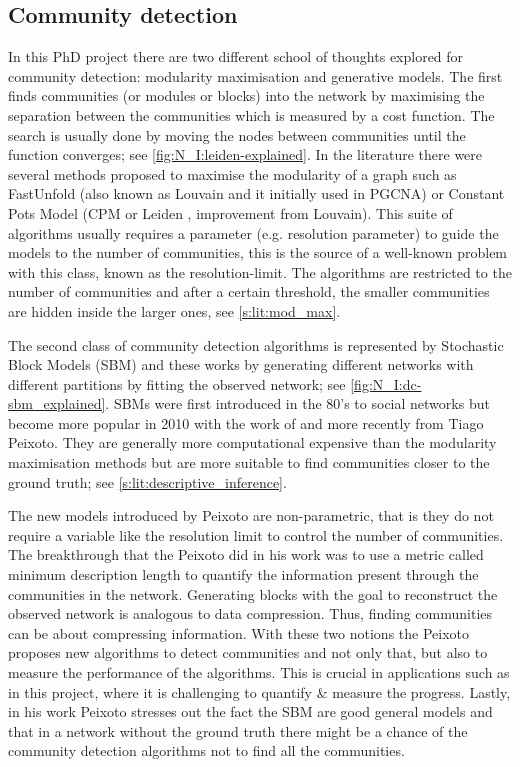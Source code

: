 \subsection{Community detection}

In this PhD project there are two different school of thoughts explored for community detection: modularity maximisation and generative models. The first finds communities (or modules or blocks) into the network by maximising the separation between the communities which is measured by a cost function. The search is usually done by moving the nodes between communities until the function converges; see \cref{fig:N_I:leiden-explained}. In the literature there were several methods proposed to maximise the modularity of a graph such as FastUnfold \citet{Blondel2008-ik} (also known as Louvain and it initially used in PGCNA) or Constant Pots Model (CPM or Leiden \citet{Traag2019-ne}, improvement from Louvain). This suite of algorithms usually requires a parameter (e.g. resolution parameter) to guide the models to the number of communities, this is the source of a well-known problem with this class, known as the resolution-limit. The algorithms are restricted to the number of communities and after a certain threshold, the smaller communities are hidden inside the larger ones, see \cref{s:lit:mod_max}.

The second class of community detection algorithms is represented by Stochastic Block Models (SBM) and these works by generating different networks with different partitions by fitting the observed network; see \cref{fig:N_I:dc-sbm_explained}. SBMs were first introduced in the 80's to social networks \citet{Holland1983-eu} but become more popular in 2010 with the work of \citet{Karrer2011-si} and more recently from Tiago Peixoto. They are generally more computational expensive than the modularity maximisation methods but are more suitable to find communities closer to the ground truth; see \cref{s:lit:descriptive_inference}.

The new models introduced by Peixoto are non-parametric, that is they do not require a variable like the resolution limit to control the number of communities. The breakthrough that the Peixoto did in his work was to use a metric called minimum description length to quantify the information present through the communities in the network. Generating blocks with the goal to reconstruct the observed network is analogous to data compression. Thus, finding communities can be about compressing information. With these two notions the Peixoto proposes new algorithms to detect communities and not only that, but also to measure the performance of the algorithms. This is crucial in applications such as in this project, where it is challenging to quantify \& measure the progress. Lastly, in his work Peixoto stresses out the fact the SBM are good general models and that in a network without the ground truth there might be a chance of the community detection algorithms not to find all the communities.

